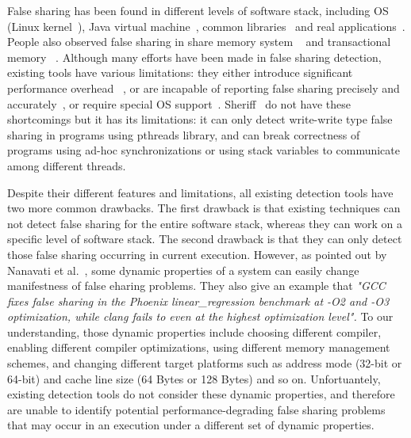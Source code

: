 False sharing has been found in different levels of software stack, including
OS (Linux kernel~\cite{OSfalsesharing}), Java virtual machine~\cite{JVMfalsesharing}, 
common libraries~\cite{libfalsesharing} and real applications~\cite{appfalsesharing, mysql}. 
People also observed false sharing in share memory system
~\cite{dsmfalsesharing} and transactional memory ~\cite{tmfalsesharing}.
Although many efforts have been made in false sharing detection, existing
tools have various limitations:
they either introduce significant performance overhead~
\cite{falseshare:simulator, falseshare:binaryinstrumentation1,falseshare:binaryinstrumentation2}, or 
are incapable of reporting false sharing 
precisely and accurately~\cite{qinzhaodetection, detect:ptu, detect:intel, falseshare:binaryinstrumentation1, DProf, falseshare:binaryinstrumentation2}, 
or require special OS support~\cite{OSdetection}.
Sheriff~\cite{sheriff} do not have these shortcomings but it has its limitations: 
it can only detect write-write type false sharing in programs using pthreads library,
and can break correctness of programs using ad-hoc synchronizations or using stack variables to 
communicate among different threads. 

Despite their different features and limitations, all existing detection tools 
have two more common drawbacks.
The first drawback is that existing techniques can not detect false sharing for 
the entire software stack, whereas they can work on a specific level of software stack.
The second drawback is that they can only detect those false sharing occurring in current execution.
However, as pointed out by Nanavati et al.~\cite{OSdetection}, 
some dynamic properties of a system can easily change manifestness of false eharing problems.
They also give an example that 
{\it "GCC fixes false sharing in the Phoenix linear\_regression benchmark 
at -O2 and -O3 optimization, while clang fails to even at the highest
optimization level".}
To our understanding, those dynamic properties include 
choosing different compiler, 
enabling different compiler optimizations, 
using different memory management schemes,
and changing different target platforms such as address mode (32-bit or 64-bit) and cache line
size (64 Bytes or 128 Bytes) and so on. 
Unfortuantely, existing detection tools do not consider these dynamic properties, and
therefore are unable to identify potential performance-degrading false
sharing problems that may occur in an execution under a different set of 
dynamic properties.

